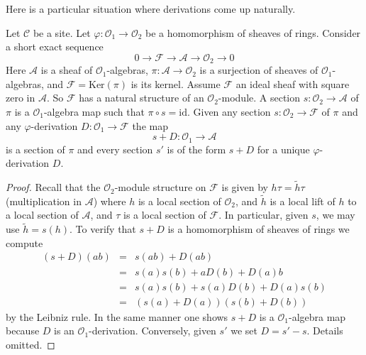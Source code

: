 \noindent
Here is a particular situation where derivations come up
naturally.

\begin{lemma}
\label{lemma-double-structure-gives-derivation}
Let $\mathcal{C}$ be a site. Let $\varphi : \mathcal{O}_1 \to \mathcal{O}_2$
be a homomorphism of sheaves of rings.
Consider a short exact sequence
$$
0 \to \mathcal{F} \to \mathcal{A} \to \mathcal{O}_2 \to 0
$$
Here $\mathcal{A}$ is a sheaf of $\mathcal{O}_1$-algebras,
$\pi : \mathcal{A} \to \mathcal{O}_2$ is a surjection
of sheaves of $\mathcal{O}_1$-algebras, and
$\mathcal{F} = \text{Ker}(\pi)$ is its kernel. Assume $\mathcal{F}$ an ideal
sheaf with square zero in $\mathcal{A}$. So $\mathcal{F}$
has a natural structure of an $\mathcal{O}_2$-module.
A section $s : \mathcal{O}_2 \to \mathcal{A}$ of $\pi$
is a $\mathcal{O}_1$-algebra map such that $\pi \circ s = \text{id}$.
Given any section $s : \mathcal{O}_2 \to \mathcal{F}$
of $\pi$ and any $\varphi$-derivation $D : \mathcal{O}_1 \to \mathcal{F}$
the map
$$
s + D : \mathcal{O}_1 \to \mathcal{A}
$$
is a section of $\pi$ and every section $s'$ is of the form $s + D$
for a unique $\varphi$-derivation $D$.
\end{lemma}

\begin{proof}
Recall that the $\mathcal{O}_2$-module structure on $\mathcal{F}$
is given by $h \tau = \tilde h \tau$ (multiplication in $\mathcal{A}$)
where $h$ is a local section of $\mathcal{O}_2$, and
$\tilde h$ is a local lift of $h$ to a local
section of $\mathcal{A}$, and $\tau$ is a local section of $\mathcal{F}$.
In particular, given $s$, we may use $\tilde h = s(h)$.
To verify that $s + D$ is a homomorphism of sheaves of rings we
compute
\begin{eqnarray*}
(s + D)(ab) & = & s(ab) + D(ab) \\
& = & s(a)s(b) + aD(b) + D(a)b \\
& = & s(a) s(b) + s(a)D(b) + D(a)s(b) \\
& = & (s(a) + D(a))(s(b) + D(b))
\end{eqnarray*}
by the Leibniz rule. In the same manner one shows
$s + D$ is a $\mathcal{O}_1$-algebra map because $D$ is
an $\mathcal{O}_1$-derivation. Conversely, given $s'$ we set
$D = s' - s$. Details omitted.
\end{proof}

